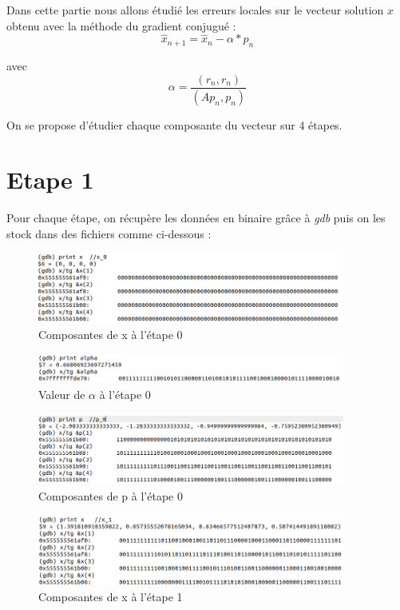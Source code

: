 \documentclass[12,french]{report}
\begin{document}
Dans cette partie nous allons étudié les erreurs locales sur le vecteur solution $\hat{x}$ obtenu avec la méthode du gradient conjugué :
$$\hat{x}_{n+1}=\hat{x}_{n}-\alpha*p_n$$

avec
$$\alpha=\frac{(r_n,r_n)}{(Ap_n,p_n)}$$

On se propose d'étudier chaque composante du vecteur sur 4 étapes.

\section{Etape 1}

Pour chaque étape, on récupère les données en binaire grâce à \textit{gdb} puis on les stock dans des fichiers comme ci-dessous :

\begin{figure}[H]
	\center
	\includegraphics[width=0.9\textwidth]{./Images/gdb_x_0}
	\caption{Composantes de x à l'étape 0}
\end{figure}

\begin{figure}[H]
	\center
	\includegraphics[width=0.9\textwidth]{./Images/gdb_alpha_0}
	\caption{Valeur de $\alpha$ à l'étape 0}
\end{figure}

\begin{figure}[H]
	\center
	\includegraphics[width=0.9\textwidth]{./Images/gdb_p_0}
	\caption{Composantes de p à l'étape 0}
\end{figure}

\begin{figure}[H]
	\center
	\includegraphics[width=0.9\textwidth]{./Images/gdb_x_1}
	\caption{Composantes de x à l'étape 1}
\end{figure}
\end{document}
